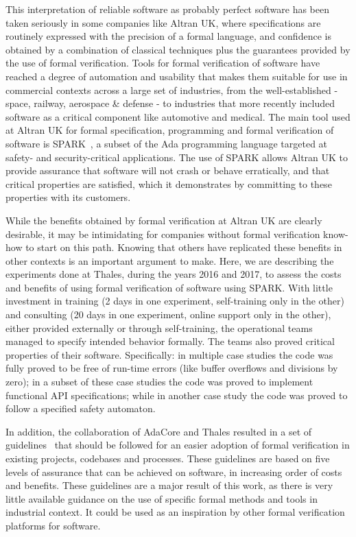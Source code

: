 \documentclass{llncs}
\begin{document}
This interpretation of reliable software as probably perfect software has been
taken seriously in some companies like Altran UK, where specifications are
routinely expressed with the precision of a formal language, and confidence is
obtained by a combination of classical techniques plus the guarantees provided
by the use of formal verification. Tools for formal verification of software
have reached a degree of automation and usability that makes them suitable for
use in commercial contexts across a large set of industries, from the
well-established - space, railway, aerospace \& defense - to industries that
more recently included software as a critical component like automotive and
medical. The main tool used at Altran UK for formal specification, programming
and formal verification of software is SPARK~\cite{mccormick15}, a subset of
the Ada programming language targeted at safety- and security-critical
applications. The use of SPARK allows Altran UK to provide assurance that
software will not crash or behave erratically, and that critical properties are
satisfied, which it demonstrates by committing to these properties with its
customers.

While the benefits obtained by formal verification at Altran UK are clearly
desirable, it may be intimidating for companies without formal verification
know-how to start on this path. Knowing that others have replicated these
benefits in other contexts is an important argument to make.  Here, we are
describing the experiments done at Thales, during the years 2016 and 2017, to
assess the costs and benefits of using formal verification of software using
SPARK. With little investment in training (2 days in one experiment, self-training
only in the other) and consulting (20 days in one experiment, online support only
in the other), either provided
externally or through self-training, the operational teams managed to specify
intended behavior formally. The teams also proved critical
properties of their software. Specifically: in multiple case studies the code was
fully proved to be free of run-time errors (like buffer overflows and divisions
by zero); in a subset of these case studies the code was proved to implement
functional API specifications; while in another case study the code was proved to
follow a specified safety automaton.

In addition, the collaboration of AdaCore and Thales resulted in a set of
guidelines~\cite{AdaCoreThalesSPARK} that should be followed for an easier
adoption of formal verification in existing projects, codebases and
processes. These guidelines are based on five levels of assurance that can be
achieved on software, in increasing order of costs and benefits. These
guidelines are a major result of this work, as there is very little available
guidance on the use of specific formal methods and tools in industrial
context. It could be used as an inspiration by other formal verification
platforms for software.
\end{document}

